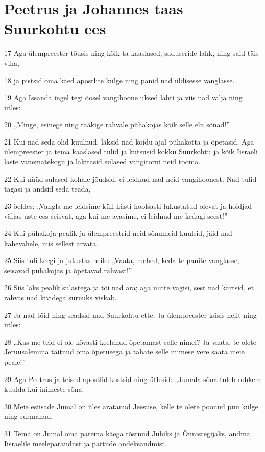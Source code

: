 \section*{Peetrus ja Johannes taas Suurkohtu ees}

\par 17 Aga ülempreester tõusis ning kõik ta kaaslased, saduseride lahk, ning said täis viha,
\par 18 ja pistsid oma käed apostlite külge ning panid nad üldisesse vanglasse.
\par 19 Aga Issanda ingel tegi öösel vangihoone uksed lahti ja viis nad välja ning ütles:
\par 20 „Minge, esinege ning rääkige rahvale pühakojas kõik selle elu sõnad!”
\par 21 Kui nad seda olid kuulnud, läksid nad koidu ajal pühakotta ja õpetasid. Aga ülempreester ja tema kaaslased tulid ja kutsusid kokku Suurkohtu ja kõik Iisraeli laste vanematekogu ja läkitasid sulased vangitorni neid tooma.
\par 22 Kui nüüd sulased kohale jõudsid, ei leidnud nad neid vangihoonest. Nad tulid tagasi ja andsid seda teada,
\par 23 öeldes: „Vangla me leidsime küll hästi hoolsasti lukustatud olevat ja hoidjad väljas uste ees seisvat, aga kui me avasime, ei leidnud me kedagi seest!”
\par 24 Kui pühakoja pealik ja ülempreestrid neid sõnumeid kuulsid, jäid nad kahevahele, mis sellest arvata.
\par 25 Siis tuli keegi ja jutustas neile: „Vaata, mehed, keda te panite vanglasse, seisavad pühakojas ja õpetavad rahvast!”
\par 26 Siis läks pealik sulastega ja tõi nad ära; aga mitte vägisi, sest nad kartsid, et rahvas nad kividega surnuks viskab.
\par 27 Ja nad tõid ning seadsid nad Suurkohtu ette. Ja ülempreester küsis neilt ning ütles:
\par 28 „Kas me teid ei ole kõvasti keelanud õpetamast selle nimel? Ja vaata, te olete Jeruusalemma täitnud oma õpetusega ja tahate selle inimese vere saata meie peale!”
\par 29 Aga Peetrus ja teised apostlid kostsid ning ütlesid: „Jumala sõna tuleb rohkem kuulda kui inimeste sõna.
\par 30 Meie esiisade Jumal on üles äratanud Jeesuse, kelle te olete poonud puu külge ning surmanud.
\par 31 Tema on Jumal oma parema käega tõstnud Juhiks ja Õnnistegijaks, andma Iisraelile meeleparandust ja pattude andeksandmist.
